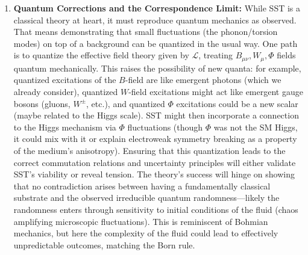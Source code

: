 \documentclass[10pt,reprint,aps,onecolumn,nofootinbib]{revtex4-2}
\begin{document}
\begin{enumerate}
    \item \textbf{Quantum Corrections and the Correspondence Limit:} While SST is a classical theory at heart, it must reproduce quantum mechanics as observed. That means demonstrating that small fluctuations (the phonon/torsion modes) on top of a background can be quantized in the usual way. One path is to quantize the effective field theory given by $\mathcal{L}$, treating $B_{\mu\nu}, W_\mu, \Phi$ fields quantum mechanically. This raises the possibility of new quanta: for example, quantized excitations of the $B$-field are like emergent photons (which we already consider), quantized $W$-field excitations might act like emergent gauge bosons (gluons, $W^\pm$, etc.), and quantized $\Phi$ excitations could be a new scalar (maybe related to the Higgs scale). SST might then incorporate a connection to the Higgs mechanism via $\Phi$ fluctuations (though $\Phi$ was not the SM Higgs, it could mix with it or explain electroweak symmetry breaking as a property of the medium’s anisotropy). Ensuring that this quantization leads to the correct commutation relations and uncertainty principles will either validate SST’s viability or reveal tension. The theory’s success will hinge on showing that no contradiction arises between having a fundamentally classical substrate and the observed irreducible quantum randomness---likely the randomness enters through sensitivity to initial conditions of the fluid (chaos amplifying microscopic fluctuations). This is reminiscent of Bohmian mechanics, but here the complexity of the fluid could lead to effectively unpredictable outcomes, matching the Born rule.

\end{enumerate}
\end{document}
